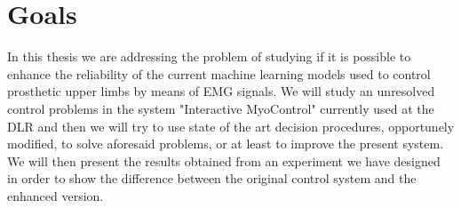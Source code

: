 \section{Goals}
In this thesis we are addressing the problem of studying if it is possible to enhance the reliability of the current machine learning models used to control prosthetic upper limbs by means of EMG signals. We will study an unresolved control problems in the system "Interactive MyoControl" currently used at the DLR and then we will try to use state of the art decision procedures, opportunely modified, to solve aforesaid problems, or at least to improve the present system.
We will then present the results obtained from an experiment we have designed in order to show the difference between the original control system and the enhanced version.